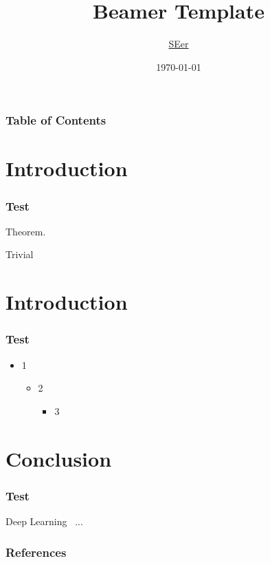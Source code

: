 \documentclass[aspectratio=169]{beamer}
\title{Beamer Template}
\author{\href{mailto:}{SEer}}
\institute{Software Institute, Nanjing University}
\date{\today}
\begin{document}
\frame{\titlepage}


\begin{frame}
\frametitle{Table of Contents}
\tableofcontents[hidesubsections]
\end{frame}

\section{Introduction}
\begin{frame}
\frametitle{Test}

\begin{block}{Theorem. }

Trivial

\end{block}


\end{frame}

\section{Introduction}
\begin{frame}
\frametitle{Test}

\begin{itemize}
    \item 1
    \begin{itemize}
        \item 2
        \begin{itemize}
            \item 3
        \end{itemize}
    \end{itemize}
\end{itemize}

\end{frame}

\section{Conclusion}
\begin{frame}
\frametitle{Test}

Deep Learning~\cite{lecun2015deep} ...

\end{frame}


\begin{frame}
\frametitle{References}
\printbibliography
\end{frame}
\end{document}
